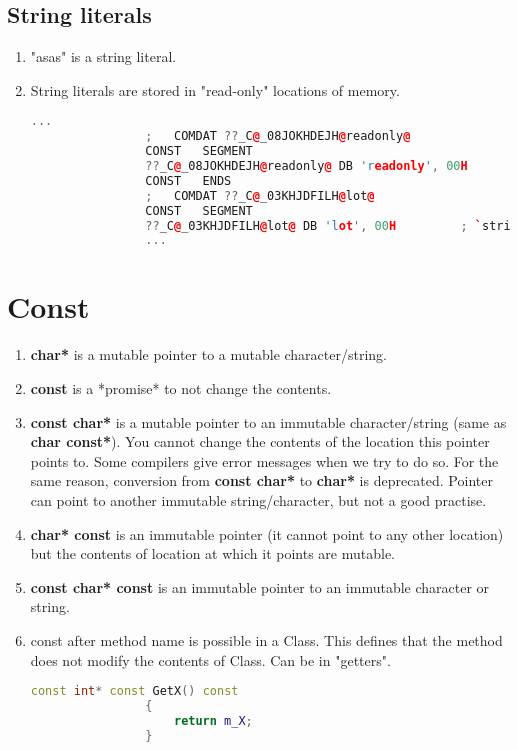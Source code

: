 \documentclass{article}
\begin{document}
    \subsection{String literals}
        \begin{enumerate}
            \item "asas" is a string literal.
            \item String literals are stored in "read-only" locations of memory.
            \begin{lstlisting}[language=C++, caption=String literals in asm file]
                ...
                ;	COMDAT ??_C@_08JOKHDEJH@readonly@
                CONST	SEGMENT
                ??_C@_08JOKHDEJH@readonly@ DB 'readonly', 00H		; `string'
                CONST	ENDS
                ;	COMDAT ??_C@_03KHJDFILH@lot@
                CONST	SEGMENT
                ??_C@_03KHJDFILH@lot@ DB 'lot', 00H			; `string'
                ...
            \end{lstlisting}
        \end{enumerate}
           
\section{Const}
    \begin{enumerate}
        \item \textbf{char*} is a mutable pointer to a mutable character/string.
        \item \textbf{const} is a *promise* to not change the contents.
        \item \textbf{const char*} is a mutable pointer to an immutable character/string (same as \textbf{char const*}). You cannot change the contents of the location this pointer points to. Some compilers give error messages when we try to do so. For the same reason, conversion from \textbf{const char*} to \textbf{char*} is deprecated. Pointer can point to another immutable string/character, but not a good practise.
        \item \textbf{char* const} is an immutable pointer (it cannot point to any other location) but the contents of location at which it points are mutable. 
        \item \textbf{const char* const} is an immutable pointer to an immutable character or string.
        \item const after method name is possible in a Class. This defines that the method does not modify the contents of Class. Can be in "getters".
            \begin{lstlisting}[language=C++, caption=Const in Class method]
                const int* const GetX() const
                {
                    return m_X;
                }
            \end{lstlisting}
    \end{enumerate}    
    
\end{document}
